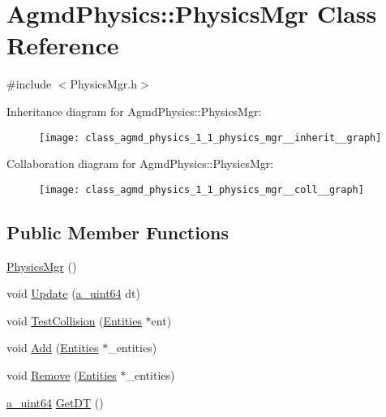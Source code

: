 \hypertarget{class_agmd_physics_1_1_physics_mgr}{\section{Agmd\+Physics\+:\+:Physics\+Mgr Class Reference}
\label{class_agmd_physics_1_1_physics_mgr}
}


{\ttfamily \#include $<$Physics\+Mgr.\+h$>$}



Inheritance diagram for Agmd\+Physics\+:\+:Physics\+Mgr\+:\nopagebreak
\begin{figure}[H]
\begin{center}
\leavevmode
\texttt{[image: class\_agmd\_physics\_1\_1\_physics\_mgr\_\_inherit\_\_graph]}
\end{center}
\end{figure}


Collaboration diagram for Agmd\+Physics\+:\+:Physics\+Mgr\+:\nopagebreak
\begin{figure}[H]
\begin{center}
\leavevmode
\texttt{[image: class\_agmd\_physics\_1\_1\_physics\_mgr\_\_coll\_\_graph]}
\end{center}
\end{figure}
\subsection*{Public Member Functions}
\begin{DoxyCompactItemize}
\item 
\hyperlink{class_agmd_physics_1_1_physics_mgr_a49a3374b7e1aa9634c35aaf00b1a1b76}{Physics\+Mgr} ()
\item 
void \hyperlink{class_agmd_physics_1_1_physics_mgr_a9b19929493f6226bcd74637d6d5ebd54}{Update} (\hyperlink{_common_defines_8h_a6c5192ec3c55d6e5b13d2dbaa082bdea}{a\+\_\+uint64} dt)
\item 
void \hyperlink{class_agmd_physics_1_1_physics_mgr_a04d6cd70454628c29cfbfe27451a5b17}{Test\+Collision} (\hyperlink{class_agmd_physics_1_1_entities}{Entities} $\ast$ent)
\item 
void \hyperlink{class_agmd_physics_1_1_physics_mgr_abdbceffd5e97cce0c687979104267542}{Add} (\hyperlink{class_agmd_physics_1_1_entities}{Entities} $\ast$\+\_\+entities)
\item 
void \hyperlink{class_agmd_physics_1_1_physics_mgr_ae353a5e4419f228a82e778eef35155a9}{Remove} (\hyperlink{class_agmd_physics_1_1_entities}{Entities} $\ast$\+\_\+entities)
\item 
\hyperlink{_common_defines_8h_a6c5192ec3c55d6e5b13d2dbaa082bdea}{a\+\_\+uint64} \hyperlink{class_agmd_physics_1_1_physics_mgr_a3a31e8c7237b0638c5fc115c01e3316d}{Get\+D\+T} ()
\end{DoxyCompactItemize}

